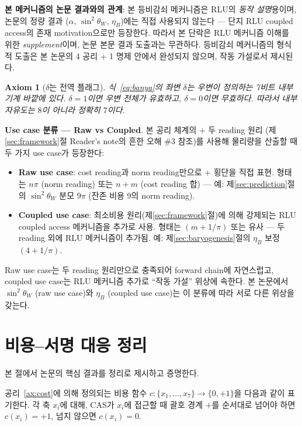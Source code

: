 \documentclass[entropy,article,submit,pdftex,oneauthor]{Definitions/mdpi}
\newtheorem{Axiom}{Axiom}
\begin{document}
\textbf{본 메커니즘의 논문 결과와의 관계}: 본 등비감쇠 메커니즘은 RLU의 \emph{동작 설명}용이며, 논문의 정량 결과 ($\alpha$, $\sin^2\theta_W$, $\eta_B$)에는 직접 사용되지 않는다 — 단지 RLU coupled access의 존재 motivation으로만 등장한다. 따라서 본 단락은 RLU 메커니즘 이해를 위한 \emph{supplement}이며, 논문 본문 결과 도출과는 무관하다. 등비감쇠 메커니즘의 형식적 도출은 본 논문의 4 공리 + 1 명제 안에서 완성되지 않으며, 작동 가설로서 제시된다.

\begin{Axiom}[$\delta$는 전역 플래그]\label{ax:delta}
식~\eqref{eq:banya}의 좌변 $\delta$는 우변이 정의하는 7비트 내부 기계 바깥에 있다. $\delta = 1$이면 우변 전체가 유효하고, $\delta = 0$이면 무효하다. 따라서 내부 자유도는 $8$이 아니라 정확히 $7$이다.
\end{Axiom}

\textbf{Use case 분류 — Raw vs Coupled}\label{rem:stage-classification}. 본 공리 체계의 $+$ 두 reading 원리 (제\ref{sec:framework}절 Reader's note의 흔한 오해 \#3 참조)를 사용해 물리량을 산출할 때 두 가지 use case가 등장한다:
\begin{itemize}
\item \textbf{Raw use case}: cost reading과 norm reading만으로 + 횡단을 직접 표현. 형태는 $n\pi$ (norm reading) 또는 $n + m$ (cost reading 합) — 예: 제\ref{sec:prediction}절의 $\sin^2\theta_W$ 분모 $9\pi$ (잔존 비용 9의 norm reading).
\item \textbf{Coupled use case}: 최소비용 원리(제\ref{sec:framework}절)에 의해 강제되는 RLU coupled access 메커니즘을 추가로 사용. 형태는 $(m + 1/\pi)$ 또는 유사 — 두 reading 외에 RLU 메커니즘이 추가됨. 예: 제\ref{sec:baryogenesis}절의 $\eta_B$ 보정 $(4 + 1/\pi)$.
\end{itemize}
Raw use case는 두 reading 원리만으로 충족되어 forward chain에 자연스럽고, coupled use case는 RLU 메커니즘 추가로 ``작동 가설'' 위상에 속한다. 본 논문에서 $\sin^2\theta_W$ (raw use case)와 $\eta_B$ (coupled use case)는 이 분류에 따라 서로 다른 위상을 갖는다.

\section{비용--서명 대응 정리}
\label{sec:theorem}

본 절에서 논문의 핵심 결과를 정리로 제시하고 증명한다.

\begin{Definition}[비용 함수]
공리~\ref{ax:cost}에 의해 정의되는 비용 함수 $c: \{x_1, \ldots, x_7\} \to \{0, +1\}$을 다음과 같이 표기한다. 각 축 $x_i$에 대해, CAS가 $x_i$에 접근할 때 괄호 경계 $+$를 순서대로 넘어야 하면 $c(x_i) = +1$, 넘지 않으면 $c(x_i) = 0$.
\end{Definition}
\end{document}
